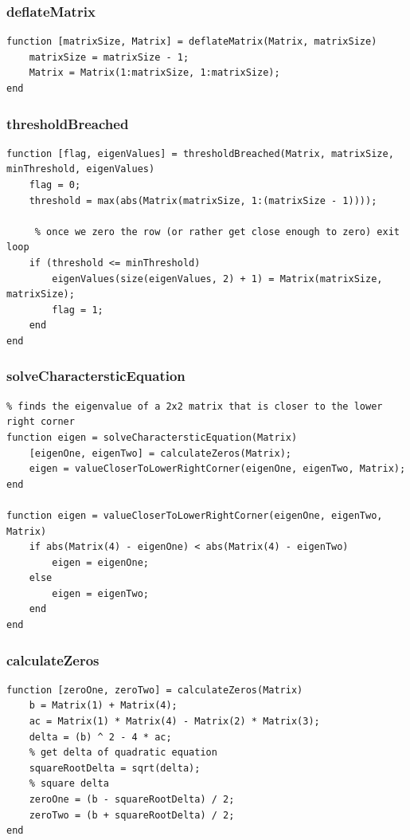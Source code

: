 \subsubsection{deflateMatrix}
\begin{simplechar}
\begin{lstlisting}
function [matrixSize, Matrix] = deflateMatrix(Matrix, matrixSize)
    matrixSize = matrixSize - 1;
    Matrix = Matrix(1:matrixSize, 1:matrixSize);
end

\end{lstlisting}
\end{simplechar}

\newpage
\subsubsection{thresholdBreached}
\begin{simplechar}
\begin{lstlisting}
function [flag, eigenValues] = thresholdBreached(Matrix, matrixSize, minThreshold, eigenValues)
    flag = 0;
    threshold = max(abs(Matrix(matrixSize, 1:(matrixSize - 1))));

     % once we zero the row (or rather get close enough to zero) exit loop
    if (threshold <= minThreshold)
        eigenValues(size(eigenValues, 2) + 1) = Matrix(matrixSize, matrixSize);
        flag = 1;
    end
end
\end{lstlisting}
\end{simplechar}

\subsubsection{solveCharactersticEquation}
\begin{simplechar}
\begin{lstlisting}
% finds the eigenvalue of a 2x2 matrix that is closer to the lower right corner
function eigen = solveCharactersticEquation(Matrix)
    [eigenOne, eigenTwo] = calculateZeros(Matrix);
    eigen = valueCloserToLowerRightCorner(eigenOne, eigenTwo, Matrix);
end

function eigen = valueCloserToLowerRightCorner(eigenOne, eigenTwo, Matrix)
    if abs(Matrix(4) - eigenOne) < abs(Matrix(4) - eigenTwo)
        eigen = eigenOne;
    else
        eigen = eigenTwo;
    end
end
\end{lstlisting}
\end{simplechar}

\subsubsection{calculateZeros}
\begin{simplechar}
\begin{lstlisting}
function [zeroOne, zeroTwo] = calculateZeros(Matrix)
    b = Matrix(1) + Matrix(4);
    ac = Matrix(1) * Matrix(4) - Matrix(2) * Matrix(3);
    delta = (b) ^ 2 - 4 * ac;
    % get delta of quadratic equation
    squareRootDelta = sqrt(delta);
    % square delta
    zeroOne = (b - squareRootDelta) / 2;
    zeroTwo = (b + squareRootDelta) / 2;
end
\end{lstlisting}
\end{simplechar}

